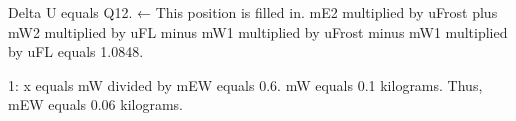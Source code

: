 Delta U equals Q12. ← This position is filled in.  
mE2 multiplied by uFrost plus mW2 multiplied by uFL minus mW1 multiplied by uFrost minus mW1 multiplied by uFL equals 1.0848.  

1: x equals mW divided by mEW equals 0.6.  
mW equals 0.1 kilograms.  
Thus, mEW equals 0.06 kilograms.